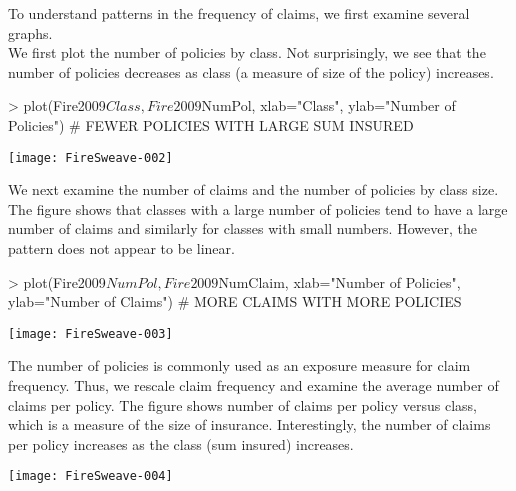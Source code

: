 \documentclass[12pt,letterpaper]{article}
\begin{document}
To understand patterns in the frequency of claims, we first examine several graphs. \\


We first plot the number of policies by class. 
Not surprisingly, we see that the number of policies decreases as class (a measure of size of the policy) increases.

\begin{center}
\begin{Schunk}
\begin{Sinput}
> plot(Fire2009$Class,Fire2009$NumPol, xlab="Class", ylab="Number of Policies")  #  FEWER POLICIES WITH LARGE SUM INSURED
\end{Sinput}
\end{Schunk}
\texttt{[image: FireSweave-002]}
\end{center}

\newpage
We next examine the number of claims and the number of policies by class size. 
The figure shows that classes with a large number of policies tend to have a large number of claims and similarly 
for classes with small numbers. However, the pattern does not appear to be linear.

\begin{center}
\begin{Schunk}
\begin{Sinput}
> plot(Fire2009$NumPol,Fire2009$NumClaim, xlab="Number of Policies", ylab="Number of Claims") #  MORE CLAIMS WITH MORE POLICIES
\end{Sinput}
\end{Schunk}
\texttt{[image: FireSweave-003]}
\end{center}

\newpage
The number of policies is commonly used as an exposure measure for claim frequency. Thus, we rescale
claim frequency and examine the average number of claims per policy.  
The figure shows number of claims per policy versus class, which is a measure of the size of insurance. Interestingly, the number of claims per policy
increases as the class (sum insured) increases. 

\begin{center}
\begin{Schunk}
\end{Schunk}
\texttt{[image: FireSweave-004]}
\end{center}
\end{document}
